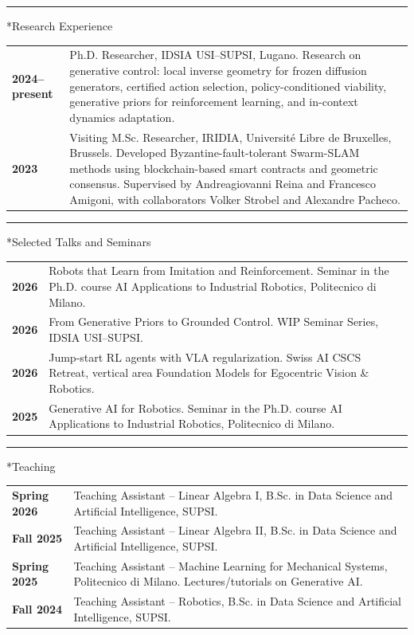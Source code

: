\documentclass[10pt,a4paper]{article}
\makeatletter
\renewcommand{\section}{\@ifstar\cvsection\cvsection}
\newcommand{\cvsection}[1]{\par\addvspace{9pt}{\large\bfseries #1\par}\nobreak\vspace{4pt}\hrule\nobreak\vspace{5pt}}
\makeatother
\begin{document}
\newpage
\section*{Research Experience}
\begin{tabularx}{\textwidth}{@{}p{}@{\hspace{8pt}}X@{}}
\textbf{2024–present} & Ph.D. Researcher, IDSIA USI–SUPSI, Lugano. Research on generative control: local inverse geometry for frozen diffusion generators, certified action selection, policy-conditioned viability, generative priors for reinforcement learning, and in-context dynamics adaptation.\\[2pt]
\textbf{2023} & Visiting M.Sc. Researcher, IRIDIA, Université Libre de Bruxelles, Brussels. Developed Byzantine-fault-tolerant Swarm-SLAM methods using blockchain-based smart contracts and geometric consensus. Supervised by Andreagiovanni Reina and Francesco Amigoni, with collaborators Volker Strobel and Alexandre Pacheco.
\end{tabularx}

\section*{Selected Talks and Seminars}
\begin{tabularx}{\textwidth}{@{}p{}@{\hspace{8pt}}X@{}}
\textbf{2026} & Robots that Learn from Imitation and Reinforcement. Seminar in the Ph.D. course AI Applications to Industrial Robotics, Politecnico di Milano.\\[2pt]
\textbf{2026} & From Generative Priors to Grounded Control. WIP Seminar Series, IDSIA USI–SUPSI.\\[2pt]
\textbf{2026} & Jump-start RL agents with VLA regularization. Swiss AI CSCS Retreat, vertical area Foundation Models for Egocentric Vision \& Robotics.\\[2pt]
\textbf{2025} & Generative AI for Robotics. Seminar in the Ph.D. course AI Applications to Industrial Robotics, Politecnico di Milano.
\end{tabularx}

\section*{Teaching}
\begin{tabularx}{\textwidth}{@{}p{}@{\hspace{8pt}}X@{}}
\textbf{Spring 2026} & Teaching Assistant – Linear Algebra I, B.Sc. in Data Science and Artificial Intelligence, SUPSI.\\[2pt]
\textbf{Fall 2025} & Teaching Assistant – Linear Algebra II, B.Sc. in Data Science and Artificial Intelligence, SUPSI.\\[2pt]
\textbf{Spring 2025} & Teaching Assistant – Machine Learning for Mechanical Systems, Politecnico di Milano. Lectures/tutorials on Generative AI.\\[2pt]
\textbf{Fall 2024} & Teaching Assistant – Robotics, B.Sc. in Data Science and Artificial Intelligence, SUPSI.
\end{tabularx}
\end{document}
